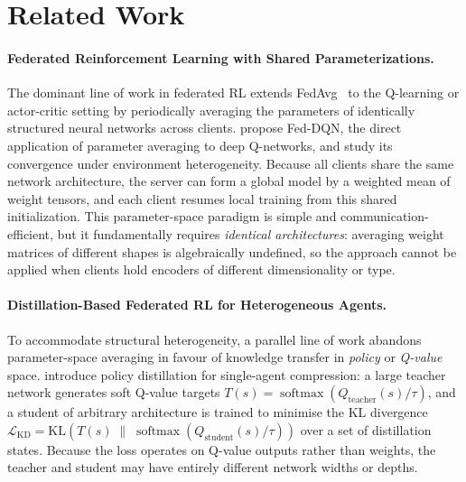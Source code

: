 %

\section{Related Work}
 \label{sec:related_work}

\paragraph{Federated Reinforcement Learning with Shared Parameterizations.}
The dominant line of work in federated RL extends FedAvg~\citep{mcmahan2017communication} to the Q-learning or actor-critic setting by periodically averaging the parameters of identically structured neural networks across clients.
\citet{jin2022federated} propose Fed-DQN, the direct application of parameter averaging to deep Q-networks, and study its convergence under environment heterogeneity.
Because all clients share the same network architecture, the server can form a global model by a weighted mean of weight tensors, and each client resumes local training from this shared initialization.
This parameter-space paradigm is simple and communication-efficient, but it fundamentally requires \emph{identical architectures}: averaging weight matrices of different shapes is algebraically undefined, so the approach cannot be applied when clients hold encoders of different dimensionality or type.

\paragraph{Distillation-Based Federated RL for Heterogeneous Agents.}
To accommodate structural heterogeneity, a parallel line of work abandons parameter-space averaging in favour of knowledge transfer in \emph{policy} or \emph{Q-value} space.
\citet{rusu2016policydistillation} introduce policy distillation for single-agent compression: a large teacher network generates soft Q-value targets
$T(s) = \operatorname{softmax}(Q_{\text{teacher}}(s)/\tau)$,
and a student of arbitrary architecture is trained to minimise the KL divergence
$\mathcal{L}_{\mathrm{KD}} = \mathrm{KL}\!\left(T(s)\;\big\|\;\operatorname{softmax}(Q_{\text{student}}(s)/\tau)\right)$
over a set of distillation states.
Because the loss operates on Q-value outputs rather than weights, the teacher and student may have entirely different network widths or depths.

